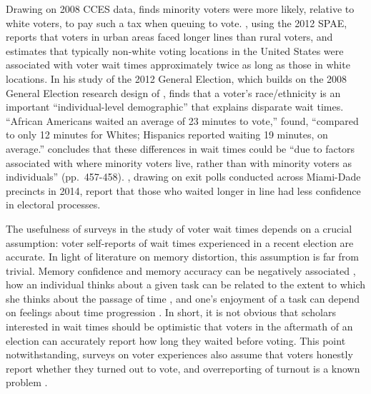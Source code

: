 \documentclass[12pt,titlepage]{article}
\begin{document}


Drawing on 2008 CCES data, \cite{mukherjee:timetax} finds minority
voters were more likely, relative to white voters, to pay such a tax
when queuing to vote. \citet{kimball:voting}, using the 2012 SPAE,
reports that voters in urban areas faced longer lines than rural
voters, and \citet{pettigrew:racegapwaittimes} estimates that
typically non-white voting locations in the United States were
associated with voter wait times approximately twice as long as those
in white locations. In his study of the 2012 General Election, which
builds on the 2008 General Election research design of
\citet{alvarez:survey}, \cite{stewart:waitingtovote2012} finds that a
voter's race/ethnicity is an important ``individual-level
demographic'' that explains disparate wait times. ``African Americans
waited an average of 23 minutes to vote,''
\citeauthor{stewart:waitingtovote2012} found, ``compared to only 12
minutes for Whites; Hispanics reported waiting 19 minutes, on
average.'' \citeauthor{stewart:waitingtovote2012} concludes that these
differences in wait times could be ``due to factors associated with
where minority voters live, rather than with minority voters as
individuals'' (pp.\ 457-458). \cite{herron:confidence}, drawing on
exit polls conducted across Miami-Dade precincts in 2014, report that
those who waited longer in line had less confidence in electoral
processes.

The usefulness of surveys in the study of voter wait times depends on
a crucial assumption: voter self-reports of wait times experienced in
a recent election are accurate.  In light of literature on memory
distortion, this assumption is far from trivial. Memory confidence and
memory accuracy can be negatively associated
\citep{hirstetal:sept11memories}, how an individual thinks
about a given task can be related to the extent to which she thinks
about the passage of time \citep{conti:timeflies}, and one's enjoyment
of a task can depend on feelings about time progression
\citep{sackettetal:timeflies}.  In short, it is not obvious
that scholars interested in wait times should be optimistic that
voters in the aftermath of an election can accurately report how long
they waited before voting.  This point notwithstanding, surveys on voter
experiences also assume that voters honestly report whether they turned out
to vote, and overreporting of turnout is a known problem
\citep{ansolhersh:bigdata}.
\end{document}

